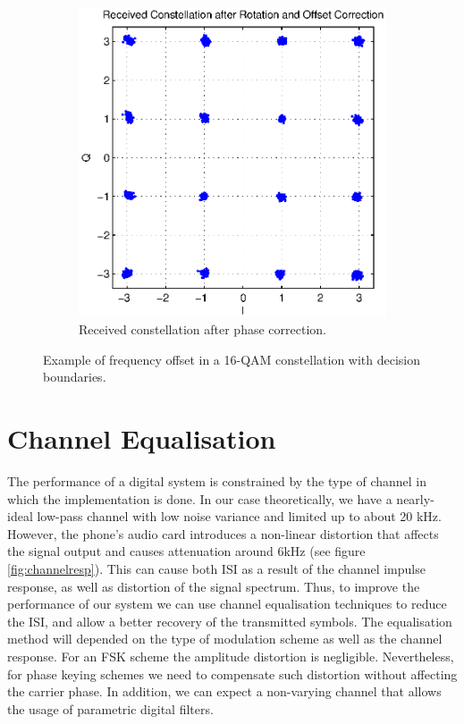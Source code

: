 \documentclass[12pt,a4paper,openright]{report}
\begin{document}
\begin{figure}[H]
    \begin{subfigure}{0.32\textwidth}
 \centering
    \includegraphics[width=0.9\linewidth]{rx_const_after.eps}
    \caption{Received constellation after phase correction.}
    \label{fig:PD3}
    \end{subfigure}
    \caption[Example of frequency offset in a 16-QAM constellation]{Example of frequency offset in a 16-QAM constellation with decision boundaries.  }
    \label{fig:phaseoff}
\end{figure}




\section{Channel Equalisation}
\label{sec:chanEQ}
The performance of a digital system is constrained by the type of channel in which the implementation is done. In our case theoretically, we have a nearly-ideal low-pass channel with low noise variance and limited up to about 20 kHz. However, the phone's audio card introduces a non-linear distortion that affects the signal output and causes attenuation around 6kHz (see figure \ref{fig:channelresp}). This can cause both ISI as a result of the channel impulse response, as well as distortion of the signal spectrum. Thus, to improve the performance of our system we can use channel equalisation techniques to reduce the ISI, and allow a better recovery of the transmitted symbols. The equalisation method will depended on the type of modulation scheme as well as the channel response. For an FSK scheme the amplitude distortion is negligible. Nevertheless, for phase keying schemes we need to compensate such distortion without affecting the carrier phase. In addition, we can expect a non-varying channel that allows the usage of parametric digital filters.  
\end{document}
